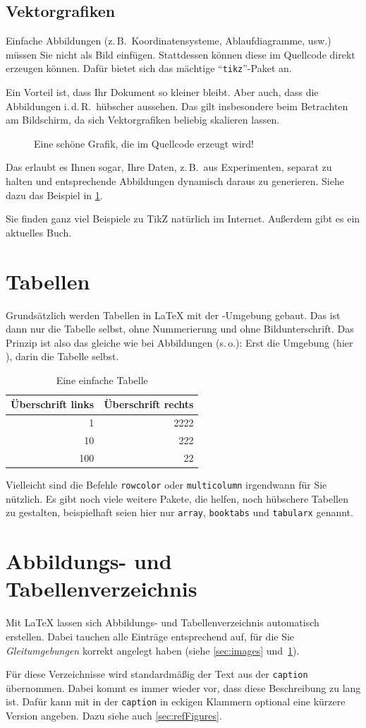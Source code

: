 \subsection{Vektorgrafiken}
\label{sec:vectorGraphcis}
%
Einfache Abbildungen (z.\,B.\ Koordinatensysteme, Ablaufdiagramme, usw.) müssen Sie nicht als Bild einfügen. Stattdessen können diese im Quellcode direkt erzeugen können. Dafür bietet sich das mächtige \enquote{\texttt{tikz}}-Paket an.
\par
Ein Vorteil ist, dass Ihr Dokument so kleiner bleibt. Aber auch, dass die Abbildungen i.\,d.\,R.\ hübscher aussehen. Das gilt insbesondere beim Betrachten am Bildschirm, da sich Vektorgrafiken beliebig skalieren lassen.
%
\begin{figure}[tbh]
\centering

\caption{Eine schöne Grafik, die im Quellcode erzeugt wird!}
\label{fig:plotFleuret}
\end{figure}
%
Das erlaubt es Ihnen sogar, Ihre Daten, z.\,B.\ aus Experimenten, separat zu halten und entsprechende Abbildungen dynamisch daraus zu generieren. Siehe dazu das Beispiel in \cref{fig:plotFleuret}.
\par
Sie finden ganz viel Beispiele zu TikZ natürlich im Internet. Außerdem gibt es ein aktuelles Buch.
%
%
\section{Tabellen}
\label{sec:tables}
Grundsätzlich werden Tabellen in \LaTeX{} mit der -Umgebung gebaut. Das ist dann nur die Tabelle selbst, ohne Nummerierung und ohne Bildunterschrift. Das Prinzip ist also das gleiche wie bei Abbildungen (s.\,o.): Erst die Umgebung (hier ), darin die Tabelle selbst.
%
\begin{table}[tbh]
 \centering
 \begin{tabular}{r|r}
 Überschrift links & Überschrift rechts\\
 \hline
 1   & 2222\\
 10  & 222\\
 100 & 22
 \end{tabular}
 \caption{Eine einfache Tabelle}
 \label{tab:example}
\end{table}
%
Vielleicht sind die Befehle \texttt{rowcolor} oder \texttt{multicolumn} irgendwann für Sie nützlich. Es gibt noch viele weitere Pakete, die helfen, noch hübschere Tabellen zu gestalten, beispielhaft seien hier nur \texttt{array}, \texttt{booktabs} und \texttt{tabularx} genannt.
%
%
\section{Abbildungs- und Tabellenverzeichnis}
\label{sec:captions}
Mit \LaTeX{} lassen sich Abbildungs- und Tabellenverzeichnis automatisch erstellen. Dabei tauchen alle Einträge entsprechend auf, für die Sie \emph{Gleitumgebungen} korrekt angelegt haben (siehe \cref{sec:images} und~\ref{sec:tables}).
\par
Für diese Verzeichnisse wird standardmäßig der Text aus der \texttt{caption} übernommen. Dabei kommt es immer wieder vor, dass diese Beschreibung zu lang ist. Dafür kann mit in der \texttt{caption} in eckigen Klammern optional eine kürzere Version angeben. Dazu siehe auch \cref{sec:refFigures}.
%
%
